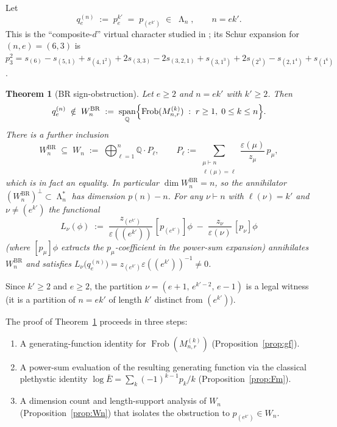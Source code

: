 \documentclass[11pt]{article}
\newtheorem{theorem}{Theorem}
\theoremstyle{definition}
\DeclareMathOperator{\Frob}{Frob}
\DeclareMathOperator{\Lam}{\Lambda}
\DeclareMathOperator{\spann}{span}
\newcommand{\bE}{\bar{E}}
\newcommand{\eps}{\varepsilon}
\newcommand{\QQ}{\mathbb{Q}}
\begin{document}
Let
\begin{equation}
   q_e^{(n)} \;:=\; p_e^{k'}\;=\;p_{(e^{k'})} \;\in\; \Lam_n,
   \qquad n=ek'.
\end{equation}
This is the ``composite-$d$'' virtual character studied in \cite{ClioSign};
its Schur expansion for $(n,e)=(6,3)$ is
$p_3^2=s_{(6)}-s_{(5,1)}+s_{(4,1^2)}+2s_{(3,3)}-2s_{(3,2,1)}
      +s_{(3,1^3)}+2s_{(2^3)}-s_{(2,1^4)}+s_{(1^6)}$.

\begin{theorem}[BR sign-obstruction]\label{thm:main}
Let $e\ge 2$ and $n=ek'$ with $k'\ge 2$. Then
\[
   q_e^{(n)} \;\notin\; W_n^{\mathrm{BR}}
   \;:=\; \spann_{\QQ}\Bigl\{\Frob(M_{n,r}^{(k)})\;:\;r\ge 1,\;0\le k\le n\Bigr\}.
\]
There is a further inclusion
\[
   W_n^{\mathrm{BR}} \;\subseteq\; W_n
   \;:=\; \bigoplus_{\ell=1}^{n}\QQ\cdot P_\ell,
   \qquad
   P_\ell:=\sum_{\substack{\mu\vdash n\\\ell(\mu)=\ell}}
              \frac{\eps(\mu)}{z_\mu}\,p_\mu,
\]
which is in fact an equality. In particular $\dim W_n^{\mathrm{BR}}=n$, so
the annihilator $\left(W_n^{\mathrm{BR}}\right)^{\!\perp}\subset\Lam_n^{*}$
has dimension $p(n)-n$.  For any $\nu\vdash n$ with $\ell(\nu)=k'$ and
$\nu\ne(e^{k'})$ the functional
\begin{equation}\label{eq:L-explicit}
   L_{\nu}(\phi)\;:=\;\frac{z_{(e^{k'})}}{\eps((e^{k'}))}\,[p_{(e^{k'})}]\phi
                \;-\;\frac{z_\nu}{\eps(\nu)}\,[p_{\nu}]\phi
\end{equation}
(where $[p_\mu]\phi$ extracts the $p_\mu$-coefficient in the power-sum
expansion) annihilates $W_n^{\mathrm{BR}}$ and satisfies
$L_\nu\bigl(q_e^{(n)}\bigr)=z_{(e^{k'})}\eps((e^{k'}))^{-1}\ne 0$.
\end{theorem}

Since $k'\ge 2$ and $e\ge 2$, the partition $\nu=(e{+}1,\,e^{k'-2},\,e{-}1)$
is a legal witness (it is a partition of $n=ek'$ of length $k'$ distinct
from $(e^{k'})$).

\medskip

The proof of Theorem~\ref{thm:main} proceeds in three steps:
\begin{enumerate}[label=(\roman*)]
\item A generating-function identity for $\Frob(M_{n,r}^{(k)})$
      (Proposition~\ref{prop:gf}).
\item A power-sum evaluation of the resulting generating function via the
      classical plethystic identity $\log\bE=\sum_k(-1)^{k-1}p_k/k$
      (Proposition~\ref{prop:Fm}).
\item A dimension count and length-support analysis of $W_n$
      (Proposition~\ref{prop:Wn}) that isolates the obstruction to
      $p_{(e^{k'})}\in W_n$.
\end{enumerate}
\end{document}
